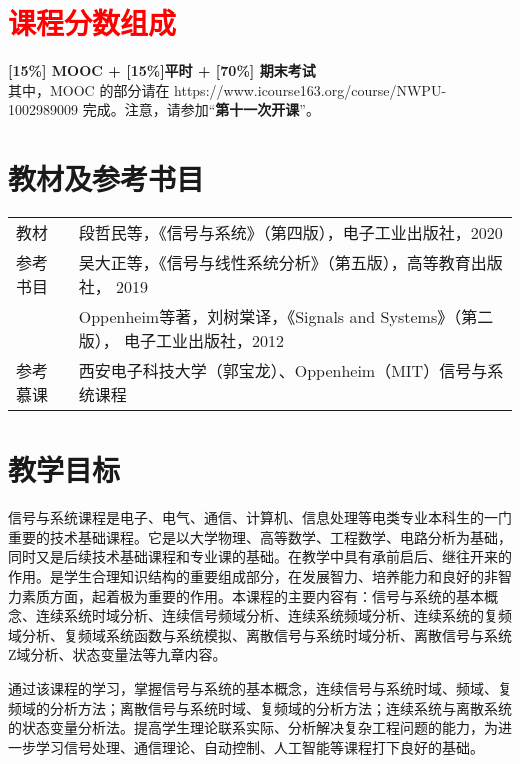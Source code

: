 \documentclass[letterpaper]{article}
\begin{document}

\section*{\textsc{\textcolor{red}{课程分数组成}}}
\textbf{[15\%] MOOC + [15\%]平时 +  [70\%] 期末考试} \vspace{.5em}\\
其中，MOOC 的部分请在 https://www.icourse163.org/course/NWPU-1002989009 完成。注意，请参加“\textbf{第十一次开课}”。


\section*{\textsc{教材及参考书目}}
\begin{tabular}{ll}
教材    & 段哲民等，《信号与系统》（第四版），电子工业出版社，2020 \vspace{.5em}\\
参考书目 & 吴大正等，《信号与线性系统分析》（第五版），高等教育出版社， 2019 \vspace{.5em} \\
& Oppenheim等著，刘树棠译，《Signals and Systems》（第二版）， 电子工业出版社，2012\vspace{.5em}\\
参考慕课 & 西安电子科技大学（郭宝龙）、Oppenheim（MIT）信号与系统课程
\end{tabular}

\section*{\textsc{教学目标}}
\quad\quad 信号与系统课程是电子、电气、通信、计算机、信息处理等电类专业本科生的一门重要的技术基础课程。它是以大学物理、高等数学、工程数学、电路分析为基础，同时又是后续技术基础课程和专业课的基础。在教学中具有承前启后、继往开来的作用。是学生合理知识结构的重要组成部分，在发展智力、培养能力和良好的非智力素质方面，起着极为重要的作用。本课程的主要内容有：信号与系统的基本概念、连续系统时域分析、连续信号频域分析、连续系统频域分析、连续系统的复频域分析、复频域系统函数与系统模拟、离散信号与系统时域分析、离散信号与系统Z域分析、状态变量法等九章内容。\par
\quad\quad 通过该课程的学习，掌握信号与系统的基本概念，连续信号与系统时域、频域、复频域的分析方法；离散信号与系统时域、复频域的分析方法；连续系统与离散系统的状态变量分析法。提高学生理论联系实际、分析解决复杂工程问题的能力，为进一步学习信号处理、通信理论、自动控制、人工智能等课程打下良好的基础。
\end{document}
